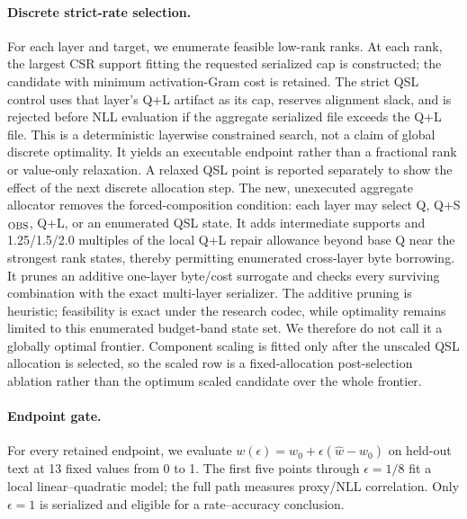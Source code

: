 \paragraph{Discrete strict-rate selection.}
For each layer and target, we enumerate feasible low-rank ranks.  At each rank,
the largest CSR support fitting the requested serialized cap is constructed;
the candidate with minimum activation-Gram cost is retained.  The strict QSL
control uses that layer's Q+L artifact as its cap, reserves alignment slack,
and is rejected before NLL evaluation if the aggregate serialized file exceeds
the Q+L file.  This is a deterministic layerwise constrained search, not a
claim of global discrete optimality.  It yields an executable endpoint rather
than a fractional rank or value-only relaxation.  A relaxed QSL point is
reported separately to show the effect of the next discrete allocation step.
The new, unexecuted aggregate allocator removes the forced-composition condition:
each layer may select Q, Q+S$_{\rm OBS}$, Q+L, or an enumerated QSL state.  It
adds intermediate supports and 1.25/1.5/2.0 multiples of the local Q+L repair
allowance beyond base Q near the strongest rank states, thereby permitting
enumerated cross-layer byte borrowing.  It prunes an additive one-layer
byte/cost surrogate and checks every surviving combination with the exact
multi-layer serializer.  The additive pruning is heuristic; feasibility is
exact under the research codec, while optimality remains limited to this
enumerated budget-band state set.  We therefore do not call it a globally
optimal frontier.  Component scaling is fitted only after the unscaled QSL
allocation is selected, so the scaled row is a fixed-allocation post-selection
ablation rather than the optimum scaled candidate over the whole frontier.

\paragraph{Endpoint gate.}
For every retained endpoint, we evaluate
$w(\epsilon)=w_0+\epsilon(\widehat w-w_0)$ on held-out text at 13 fixed
values from 0 to 1.  The first five points through $\epsilon=1/8$ fit a local
linear--quadratic model; the full path measures proxy/NLL correlation.  Only
$\epsilon=1$ is serialized and eligible for a rate--accuracy conclusion.
